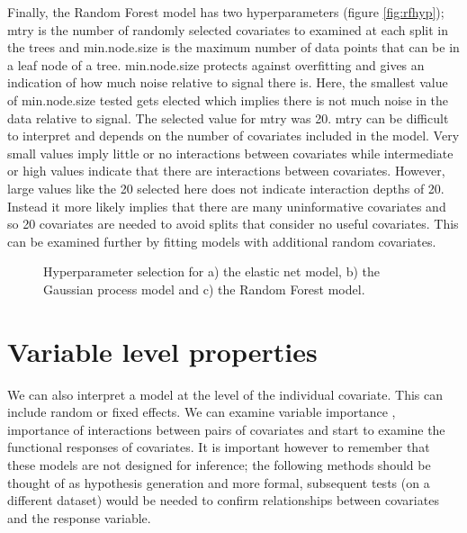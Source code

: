 \documentclass[10pt,]{article}
\begin{document}
Finally, the Random Forest model has two hyperparameters (figure \ref{fig:rfhyp}); mtry is the number of randomly selected covariates to examined at each split in the trees and min.node.size is the maximum number of data points that can be in a leaf node of a tree.
min.node.size protects against overfitting and gives an indication of how much noise relative to signal there is.
Here, the smallest value of min.node.size tested gets elected which implies there is not much noise in the data relative to signal.
The selected value for mtry was 20.
mtry can be difficult to interpret and depends on the number of covariates included in the model.
Very small values imply little or no interactions between covariates while intermediate or high values indicate that there are interactions between covariates.
However, large values like the 20 selected here does not indicate interaction depths of 20.
Instead it more likely implies that there are many uninformative covariates and so 20 covariates are needed to avoid splits that consider no useful covariates.
This can be examined further by fitting models with additional random covariates.


\begin{figure}[t!]
  \centering

  \label{fig:hyp}
  \caption{
    Hyperparameter selection for a) the elastic net model, b) the Gaussian process model and c) the Random Forest model.
  }
\end{figure}

\section{Variable level properties}\label{variable-level-properties}

We can also interpret a model at the level of the individual covariate.
This can include random or fixed effects.
We can examine variable importance \citep{oppel2009alternative}, importance of interactions between pairs of covariates and start to examine the functional responses of covariates.
It is important however to remember that these models are not designed for inference; the following methods should be thought of as hypothesis generation and more formal, subsequent tests (on a different dataset) would be needed to confirm relationships between covariates and the response variable.
\end{document}
